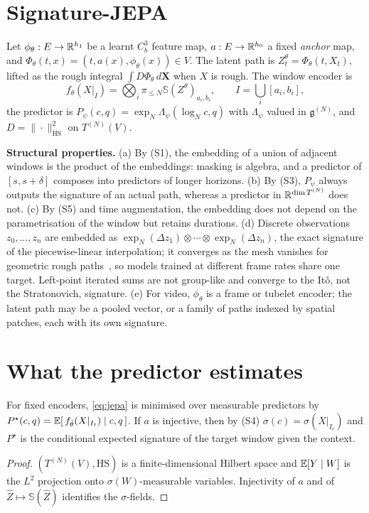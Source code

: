 \documentclass[10pt,twocolumn]{article}
\newcommand{\Sig}{\mathbb{S}}
\newcommand{\T}{T^{(N)}}
\newcommand{\g}{\mathfrak{g}^{(N)}}
\begin{document}
\section{Signature-JEPA}
\begin{definition}
Let $\phi_\theta:E\to\mathbb{R}^{h_1}$ be a learnt $C^3_b$ feature map, $a:E\to\mathbb{R}^{h_0}$ a fixed \emph{anchor} map, and $\Phi_\theta(t,x)=(t,a(x),\phi_\theta(x))\in V$. The latent path is $Z^\theta_t=\Phi_\theta(t,X_t)$, lifted as the rough integral $\int D\Phi_\theta\,d\mathbf X$ when $X$ is rough. The window encoder is
\[
f_\theta(X|_{I})=\textstyle\bigotimes_{i}\pi_{\le N}\Sig(Z^\theta)_{a_i,b_i},\qquad I=\bigcup_i[a_i,b_i],
\]
the predictor is $P_\psi(c,q)=\exp_N\Lambda_\psi(\log_N c,q)$ with $\Lambda_\psi$ valued in $\g$, and $D=\|\cdot\|^2_{\mathrm{HS}}$ on $\T(V)$.
\end{definition}
\textbf{Structural properties.} (a) By (S1), the embedding of a union of adjacent windows is the product of the embeddings: masking is algebra, and a predictor of $[s,s+\delta]$ composes into predictors of longer horizons. (b) By (S3), $P_\psi$ always outputs the signature of an actual path, whereas a predictor in $\R^{\dim\T}$ does not. (c) By (S5) and time augmentation, the embedding does not depend on the parametrisation of the window but retains durations. (d) Discrete observations $z_0,\dots,z_n$ are embedded as $\exp_N(\Delta z_1)\otimes\cdots\otimes\exp_N(\Delta z_n)$, the exact signature of the piecewise-linear interpolation; it converges as the mesh vanishes for geometric rough paths~\cite{friz2010}, so models trained at different frame rates share one target. Left-point iterated sums are not group-like and converge to the Itô, not the Stratonovich, signature. (e) For video, $\phi_\theta$ is a frame or tubelet encoder; the latent path may be a pooled vector, or a family of paths indexed by spatial patches, each with its own signature.

\section{What the predictor estimates}
\begin{proposition}\label{prop:opt}
For fixed encoders, \eqref{eq:jepa} is minimised over measurable predictors by $P^\star(c,q)=\mathbb{E}[\,f_{\bar\theta}(X|_{I_t})\mid c,q\,]$. If $a$ is injective, then by (S4) $\sigma(c)=\sigma(X|_{I_c})$ and $P^\star$ is the conditional expected signature of the target window given the context.
\end{proposition}
\begin{proof}
$(\T(V),\mathrm{HS})$ is a finite-dimensional Hilbert space and $\mathbb{E}[Y\mid W]$ is the $L^2$ projection onto $\sigma(W)$-measurable variables. Injectivity of $a$ and of $\hat Z\mapsto\Sig(\hat Z)$ identifies the $\sigma$-fields.
\end{proof}
\end{document}
